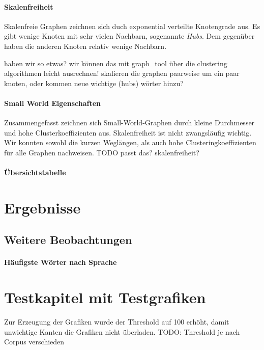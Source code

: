 \documentclass[12pt, a4paper]{article}
\begin{document}
                             
\paragraph{Skalenfreiheit}
Skalenfreie Graphen zeichnen sich duch exponential verteilte Knotengrade aus. Es gibt wenige Knoten mit sehr vielen Nachbarn, sogenannte \emph{Hubs}. Dem gegenüber haben die anderen Knoten relativ wenige Nachbarn. 

haben wir so etwas? wir können das mit graph\_tool über die
clustering algorithmen leicht ausrechnen!  skalieren die graphen paarweise um
ein paar knoten, oder kommen neue wichtige (hubs) wörter hinzu?

\paragraph{Small World Eigenschaften}
Zusammengefasst zeichnen sich Small-World-Graphen durch kleine Durchmesser und
hohe Clusterkoeffizienten aus. Skalenfreiheit ist nicht zwangsläufig wichtig.
Wir konnten sowohl die kurzen Weglängen, als auch hohe Clusteringkoeffizienten
für alle Graphen nachweisen. TODO passt das? skalenfreiheit? 


\paragraph{Übersichtstabelle}
\section{Ergebnisse}
\subsection{Weitere Beobachtungen}
\paragraph{H\"aufigste W\"orter nach Sprache}

\section{Testkapitel mit Testgrafiken}
Zur Erzeugung der Grafiken wurde der Threshold auf 100 erhöht, damit unwichtige Kanten die Grafiken nicht überladen.
TODO: Threshold je nach Corpus verschieden
\end{document}
